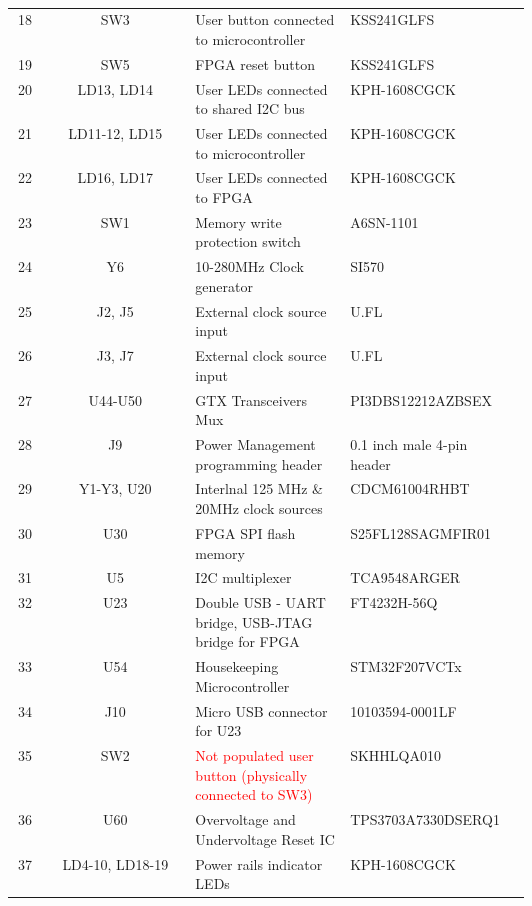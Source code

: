 \documentclass[12pt,oneside,a4]{article}
\begin{document}
\begin{table}[htbp]
\begin{tabular}{@{}ccp{0.3\linewidth}p{0.3\linewidth}c@{}}
18 & SW3 & User button connected to microcontroller      &  KSS241GLFS  &  \\
19 & SW5 & FPGA reset button   		 & KSS241GLFS      &  \\
20 & LD13, LD14 & User LEDs connected to shared I2C bus & KPH-1608CGCK &  \\
21 & LD11-12, LD15 & User LEDs connected to microcontroller &  KPH-1608CGCK  &  \\
22 & LD16, LD17    & User LEDs connected to FPGA &  KPH-1608CGCK     &  \\
23 & SW1 & Memory write protection switch  & A6SN-1101 &  \\
24 & Y6  & 10-280MHz Clock generator   & SI570  &  \\
25 & J2, J5    & External clock source input & U.FL      &  \\
26 & J3, J7 &  External clock source input &   U.FL       &  \\
27 & U44-U50    & GTX Transceivers Mux & PI3DBS12212AZBSEX  &  \\
28 & J9  & Power Management programming header & 0.1 inch male 4-pin header &  \\
29 & Y1-Y3, U20 & Interlnal 125 MHz \& 20MHz clock sources & CDCM61004RHBT &  \\
30 & U30 &  FPGA SPI flash memory  & S25FL128SAGMFIR01 &  \\
31 & U5  &  I2C multiplexer    & TCA9548ARGER   &  \\
32 & U23 &  Double USB - UART bridge, USB-JTAG bridge for FPGA & FT4232H-56Q   &  \\
33 & U54 & Housekeeping Microcontroller  & STM32F207VCTx  &  \\
34 & J10 & Micro USB connector for U23  & 10103594-0001LF  &  \\
35 & SW2 & \textcolor{red}{Not populated user button (physically connected to SW3)}  & SKHHLQA010  &  \\
36 & U60 & Overvoltage and Undervoltage Reset IC & TPS3703A7330DSERQ1 &  \\
37 & LD4-10, LD18-19 & Power rails indicator LEDs & KPH-1608CGCK &  \\ \bottomrule

\end{tabular}
\caption{}
\label{tab:my-table}
\end{table}
\hspace*{-1cm}
\end{document}
